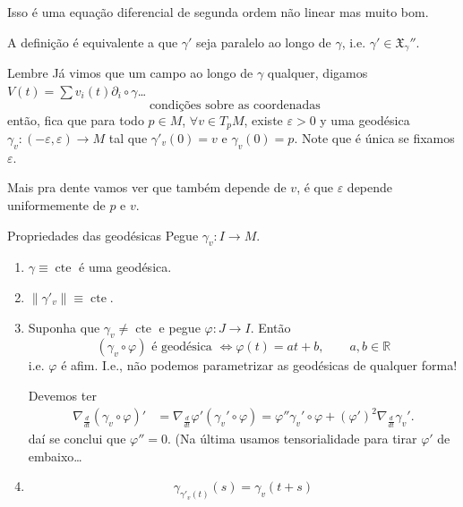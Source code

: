 \begin{remark}\leavevmode
Isso é uma equação diferencial de segunda ordem não linear mas muito bom.
\end{remark}

\begin{remark}\leavevmode
A definição é equivalente a que \(\gamma'\) seja paralelo ao longo de \(\gamma\), i.e. \(\gamma' \in \mathfrak{X}_\gamma''\).
\end{remark}

\begin{thing7}{Lembre}\leavevmode
Já vimos que um campo ao longo de \(\gamma\) qualquer, digamos \(V(t)=\sum v_i(t)\partial_i \circ \gamma\)…
\[\text{ condições sobre as coordenadas} \]
então, fica que para todo \(p \in M\), \(\forall  v \in T_pM\), existe \(\varepsilon>0\) y uma geodésica \(\gamma_v:(-\varepsilon,\varepsilon)\to M\) tal que \(\gamma'_v(0)=v\) e \(\gamma_v(0)=p\). Note que é única se fixamos \(\varepsilon\).

Mais pra dente vamos ver que também depende de \(v\), é que \(\varepsilon\) depende uniformemente de \(p\) e \(v\).

\end{thing7}


\begin{thing8}{Propriedades das geodésicas}\leavevmode
Pegue \(\gamma_v:I \to M\).
	\begin{enumerate}
\item \(\gamma \equiv \operatorname{cte}\) é uma geodésica.
\item \(\|\gamma'_v\|\equiv \operatorname{cte}\).
\item Suponha que \(\gamma_v \neq  \operatorname{cte}\) e pegue \(\varphi:J \to I\). Então
	\[(\gamma_v \circ \varphi)\text{ é geodésica } \iff \varphi(t)=at+b, \qquad a,b \in \mathbb{R}\]
	i.e. \(\varphi\) é afim. I.e., não podemos parametrizar as geodésicas de qualquer forma!

	Devemos ter
\begin{align*}
\nabla_{\frac{d}{dt}}(\gamma_v \circ \varphi)'&=\nabla_{\frac{d}{dt}}\varphi'(\gamma_v' \circ \varphi)=\varphi'' \gamma_v' \circ \varphi+ (\varphi')^2\nabla_{\frac{d}{dt}}\gamma_v'.
\end{align*}
daí se conclui que \(\varphi''=0\). (Na última usamos tensorialidade para tirar \(\varphi'\) de embaixo…

\item
	\[\gamma_{\gamma'_v(t)}(s)=\gamma_v(t+s)\]
\end{enumerate}
\end{thing8}

